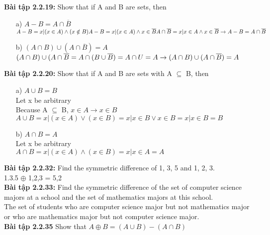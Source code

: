 \documentclass[a4paper]{article}
\begin{document}
\begin{enumerate}
\textbf{Bài tập 2.2.19:} Show that if A and B are sets, then\\
\begin{enumerate}
	\item[a)] $A - B = A \cap {}$
	$A - B ={x | (x \in A) \land (x \notin B)}\\
	 A - B ={x | (x \in A) \land x \in {}}\\
	 A \cap {}={x | x \in A \land x \in {}}\\
	\rightarrow A - B = A \cap {}$ 
	\item[b)] $(A \cap B) \cup (A \cap {}) = A$
		$(A \cap B) \cup (A \cap {} = A \cap (B \cup {}) = A \cap U = A\\
		\rightarrow (A \cap B) \cup (A \cap {}) = A$
\end{enumerate}
\textbf{Bài tập 2.2.20:} Show that if A and B are sets with A $\subseteq$ B, then
\begin{enumerate}
	\item[a)] $A \cup B = B$\\
	Let x be arbitrary\\
	Because A $\subseteq$ B, $x \in A \rightarrow x \in B$
	$A \cup B = {x | (x \in A) \lor (x \in B)} = {x | x \in B \lor x \in B} = {x | x \in B} = B$\\
	\item[b)] $A \cap B = A$\\
	Let x be arbitrary\\
	$A \cap B = {x | (x \in A) \land (x \in B)} = {x | x \in A} = A$\\
\end{enumerate}
\textbf{Bài tập 2.2.32:} Find the symmetric difference of {1, 3, 5} and {1, 2, 3}.\\
{1.3.5} $\oplus$ {1,2,3} = {5,2}\\
\textbf{Bài tập 2.2.33:} Find the symmetric difference of the set of computer science majors at a school and the set of mathematics majors at this school.\\
The set of students who are computer science major but not mathematics major or who are mathematics major but not computer science major.\\
\textbf{Bài tập 2.2.35} Show that $A \oplus B = (A \cup B) - (A \cap B)$\\

\end{enumerate}
\end{document}
